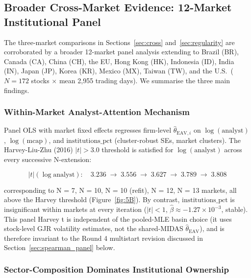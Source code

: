 \documentclass[12pt,a4paper]{article}
\begin{document}
\subsection{Broader Cross-Market Evidence: 12-Market Institutional Panel}
\label{sec:cross_market_panel}

The three-market comparisons in Sections~\ref{sec:cross} and~\ref{sec:regularity} are
corroborated by a broader 12-market panel analysis extending to Brazil (BR), Canada (CA),
China (CH), the EU, Hong Kong (HK), Indonesia (ID), India (IN), Japan (JP), Korea (KR), Mexico
(MX), Taiwan (TW), and the U.S.\ ($N = 172$ stocks $\times$ mean
2{,}955 trading days). We summarise the three main findings.

\subsubsection{Within-Market Analyst-Attention Mechanism}
\label{sec:within_analyst}

Panel OLS with market fixed effects regresses firm-level $\hat{\theta}_{\mathrm{EAV},i}$
on $\log(\mathrm{analyst})$, $\log(\mathrm{mcap})$, and $\mathrm{institutions\_pct}$
(cluster-robust SEs, market clusters). The Harvey-Liu-Zhu (2016) $|t| > 3.0$ threshold
is satisfied for $\log(\mathrm{analyst})$ across every successive N-extension:

\begin{equation}
|t|(\log\mathrm{analyst}): \quad 3.236 \;\to\; 3.556 \;\to\; 3.627 \;\to\; 3.789 \;\to\; 3.808
\label{eq:analyst_trajectory}
\end{equation}

corresponding to N = 7, N = 10, N = 10 (refit), N = 12, N = 13 markets,
all above the Harvey threshold
(Figure~\ref{fig:5B}).
By contrast, $\mathrm{institutions\_pct}$ is insignificant within markets at
every iteration ($|t| < 1$, $\hat{\beta} \approx -1.27 \times 10^{-3}$, stable).
This panel Harvey t is independent of the pooled-MLE basin choice (it uses stock-level
GJR volatility estimates, not the shared-MIDAS $\hat{\theta}_{\mathrm{EAV}}$), and is
therefore invariant to the Round 4 multistart revision discussed in
Section~\ref{sec:spearman_panel} below.

\subsubsection{Sector-Composition Dominates Institutional Ownership}
\label{sec:sector_fe}
\end{document}
